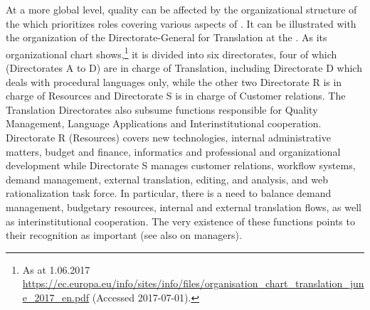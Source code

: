 \documentclass[output=paper]{langsci/langscibook}
\begin{document}
At a more global level, quality can be affected by the organizational structure of the  which prioritizes roles covering various aspects of . It can be illustrated with the organization of the Directorate{}-General for Translation at the . As its organizational chart shows,\footnote{As at 1.06.2017 \url{https://ec.europa.eu/info/sites/info/files/organisation_chart_translation_june_2017_en.pdf} (Accessed 2017-07-01).} it is divided into six directorates, four of which (Directorates A to D) are in charge of Translation, including Directorate D which deals with procedural languages only, while the other two Directorate R is in charge of Resources and Directorate S is in charge of Customer relations. The Translation Directorates also subsume functions responsible for Quality Management, Language Applications and Interinstitutional cooperation. Directorate R (Resources) covers new technologies, internal administrative matters, budget and finance, informatics and professional and organizational development while Directorate S manages customer relations, workflow systems, demand management, external translation, editing,  and analysis, and web rationalization task force. In particular, there is a need to balance demand management, budgetary resources, internal and external translation flows, as well as interinstitutional cooperation. The very existence of these functions points to their recognition as important (see also  on  managers).
\end{document}

